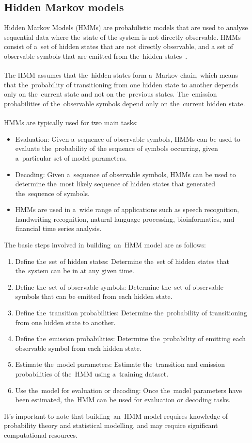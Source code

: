 \subsection{Hidden Markov models}\label{subsec:hmm}
Hidden Markov Models (HMMs) are probabilistic models that are used to analyse sequential data where the~state of the
system is not directly observable. HMMs consist of a~set of hidden states that are not directly observable, and a
set of observable symbols that are emitted from the~hidden states~\cite{math10081230}.\\
\\
The HMM assumes that the~hidden states form a~Markov chain, which means that the~probability of transitioning from
one hidden state to another depends only on the~current state and not on the~previous states. The~emission
probabilities of the~observable symbols depend only on the~current hidden state.\\
\\
HMMs are typically used for two main tasks:
\begin{itemize}
    \item Evaluation: Given a~sequence of observable symbols, HMMs can be used to evaluate the~probability of the
    sequence of symbols occurring, given a~particular set of model parameters.
    \item Decoding: Given a~sequence of observable symbols, HMMs can be used to determine the~most likely
    sequence of hidden states that generated the~sequence of symbols.
    \item HMMs are used in a~wide range of applications such as speech recognition, handwriting recognition, natural
    language processing, bioinformatics, and financial time series analysis.
\end{itemize}
The basic steps involved in building~an~HMM model are as follows:
\begin{enumerate}
    \item Define the~set of hidden states: Determine the~set of hidden states that the~system can be in at any given time.
    \item Define the~set of observable symbols: Determine the~set of observable symbols that can be emitted from each hidden state.
    \item Define the~transition probabilities: Determine the~probability of transitioning from one hidden state to another.
    \item Define the~emission probabilities: Determine the~probability of emitting each observable symbol from each hidden state.
    \item Estimate the~model parameters: Estimate the~transition and emission probabilities of the~HMM using a~training dataset.
    \item Use the~model for evaluation or decoding: Once the~model parameters have been estimated, the~HMM
    can be used for evaluation or decoding tasks.
\end{enumerate}
It's important to note that building~an~HMM model requires knowledge of probability theory and statistical
modelling, and may require significant computational resources.



